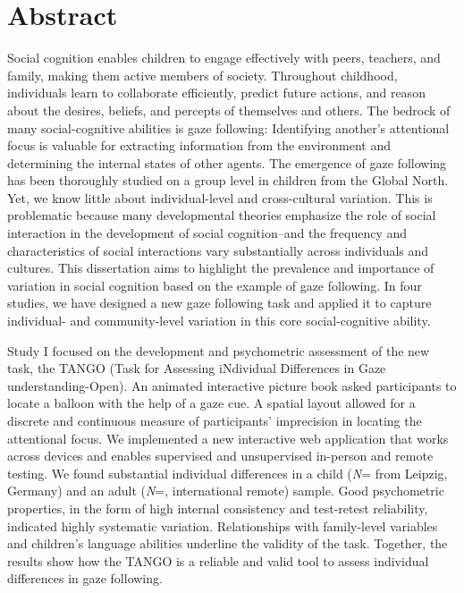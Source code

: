 \documentclass[
]{scrbook}
\begin{document}
\chapter{Abstract}\label{abstract}

Social cognition enables children to engage effectively with peers, teachers, and family, making them active members of society. Throughout childhood, individuals learn to collaborate efficiently, predict future actions, and reason about the desires, beliefs, and percepts of themselves and others. The bedrock of many social-cognitive abilities is gaze following: Identifying another's attentional focus is valuable for extracting information from the environment and determining the internal states of other agents. The emergence of gaze following has been thoroughly studied on a group level in children from the Global North. Yet, we know little about individual-level and cross-cultural variation. This is problematic because many developmental theories emphasize the role of social interaction in the development of social cognition\thinspace --\thinspace and the frequency and characteristics of social interactions vary substantially across individuals and cultures. This dissertation aims to highlight the prevalence and importance of variation in social cognition based on the example of gaze following. In four studies, we have designed a new gaze following task and applied it to capture individual- and community-level variation in this core social-cognitive ability.

Study I focused on the development and psychometric assessment of the new task, the TANGO (Task for Assessing iNdividual Differences in Gaze understanding-Open). An animated interactive picture book asked participants to locate a balloon with the help of a gaze cue. A spatial layout allowed for a discrete and continuous measure of participants' imprecision in locating the attentional focus. We implemented a new interactive web application that works across devices and enables supervised and unsupervised in-person and remote testing. We found substantial individual differences in a child (\emph{N}\thinspace= from Leipzig, Germany) and an adult (\emph{N}\thinspace =, international remote) sample. Good psychometric properties, in the form of high internal consistency and test-retest reliability, indicated highly systematic variation. Relationships with family-level variables and children's language abilities underline the validity of the task. Together, the results show how the TANGO is a reliable and valid tool to assess individual differences in gaze following.
\end{document}
